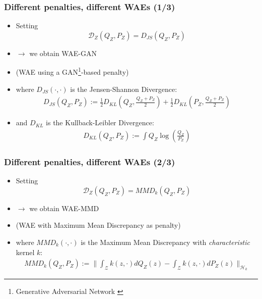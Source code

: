 \documentclass{beamer}
\begin{document}
\begin{frame}
\frametitle{Different penalties, different WAEs (1/3)}
\begin{itemize}
  \item Setting $$ \mathcal{D}_Z(Q_Z,P_Z) = D_{JS}(Q_Z, P_Z) $$
  \vspace*{-\baselineskip}
  \item[]$\rightarrow$ we obtain WAE-GAN
  \item[](WAE using a GAN\footnote{Generative Adversarial Network \cite{gan}}-based penalty)
  \bigskip
  \item where $D_{JS}(\cdot,\cdot)$ is the Jensen-Shannon Divergence:
  \begin{align}
    D_{JS}(Q_Z,P_Z) := \frac{1}{2} D_{KL}(Q_Z, \frac{Q_Z + P_Z}{2})
      + \frac{1}{2} D_{KL}(P_Z, \frac{Q_Z + P_Z}{2})
  \end{align}
  \item and $D_{KL}$ is the Kullback-Leibler Divergence:
  \begin{align}
    D_{KL}(Q_Z,P_Z) := \int Q_Z \log \left( \frac{Q_Z}{P_Z}\right )
  \end{align}
\end{itemize}
\end{frame}
\begin{frame}
\frametitle{Different penalties, different WAEs (2/3)}
\begin{itemize}
  \item Setting $$ \mathcal{D}_Z(Q_Z,P_Z) = MMD_k(Q_Z, P_Z) $$
  \vspace*{-\baselineskip}
  \item[]$\rightarrow$ we obtain WAE-MMD
  \item[] (WAE with Maximum Mean Discrepancy as penalty)
  \bigskip
  \item where $MMD_k(\cdot,\cdot)$ is the Maximum Mean Discrepancy with \textit{characteristic} kernel $k$:
  \begin{align*}
    MMD_k(Q_Z,P_Z) := \Big\| \int_{\mathcal{Z}} k(z, \cdot)dQ_Z(z) -
      \int_{\mathcal{Z}} k(z, \cdot)dP_Z(z)\Big\|_{\mathcal{H}_k}
  \end{align*}
\end{itemize}
\end{frame}
\end{document}
